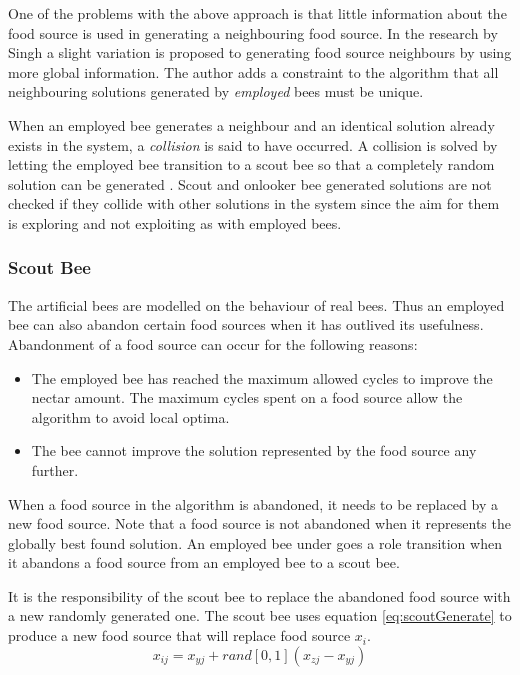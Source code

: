 One of the problems with the above approach is that little information about the food source is used in generating a neighbouring food source. In the research by Singh \cite{ABCLeafConstrained} a slight variation is proposed to generating food source neighbours by using more global information. The author adds a constraint to the algorithm that all neighbouring solutions generated by \emph{employed} bees must be unique. 

When an employed bee generates a neighbour and an identical solution already exists in the system, a \emph{collision} is said to have occurred. A collision is solved by letting the employed bee transition to a scout bee so that a completely random solution can be generated \cite{ABCLeafConstrained}. Scout and onlooker bee generated solutions are not checked if they collide with other solutions in the system since the aim for them is exploring and not exploiting as with employed bees\cite{BeeJobShop,ABCCompareStudy}. 
\subsubsection{Scout Bee}
The artificial bees are modelled on the behaviour of real bees. Thus an employed bee can also abandon certain food sources when it has outlived its usefulness. Abandonment of a food source can occur for the following reasons\cite{BeeJobShop,ABCNumericalOptimization,ABCImageEnhancement}:
\begin{itemize}
\item The employed bee has reached the maximum allowed cycles to improve the nectar amount. The maximum cycles spent on a food source allow the algorithm to avoid local optima\cite{ABCCompareStudy,ABCNumericalOptimization,ABCImageEnhancement}.
\item The bee cannot improve the solution represented by the food source any further\cite{ABCCompareStudy,ABCNumericalOptimization,ABCImageEnhancement}.
\end{itemize}
When a food source in the algorithm is abandoned, it needs to be replaced by a new food source\cite{BeeJobShop,ABCCompareStudy,ABCImageEnhancement}. Note that a food source is not abandoned when it represents the globally best found solution. An employed bee under goes a role transition when it abandons a food source from an employed bee to a scout bee\cite{ABCCompareStudy,ABCNumericalOptimization,ABCImageEnhancement}. 

It is the responsibility of the scout bee to replace the abandoned food source with a new randomly generated one\cite{BeeJobShop,ABCCompareStudy,ABCImageEnhancement}. The scout bee uses equation \ref{eq:scoutGenerate} to produce a new food source that will replace food source $x_i$.
\begin{equation}
\label{eq:scoutGenerate}
x_{ij} = x_{yj} + rand[0,1](x_{zj} - x_{yj})
\end{equation}

